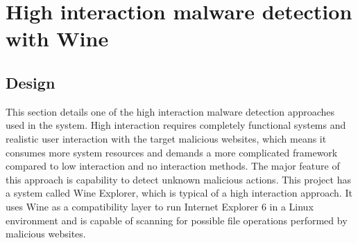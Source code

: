 \section{High interaction malware detection with Wine}
\subsection{Design}
This section details one of the high interaction malware detection 
approaches used in the system. High interaction requires completely functional systems 
and realistic user interaction with the target malicious websites, which means 
it consumes more system resources and demands a more complicated 
framework compared to low interaction and no interaction methods. The major 
feature of this approach is capability to detect unknown malicious 
actions. This project has a system called Wine Explorer, 
which is typical of a high interaction approach. It uses Wine as a compatibility layer to run 
Internet Explorer 6 in a Linux environment and is capable of scanning for 
possible file operations performed by malicious websites. 

